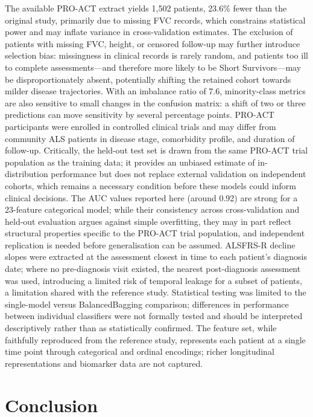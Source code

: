 \documentclass[preprint,12pt]{elsarticle}
\begin{document}
The available PRO-ACT extract yields 1,502 patients, 23.6\% fewer than the
original study, primarily due to missing FVC records, which constrains statistical
power and may inflate variance in cross-validation estimates. The exclusion of
patients with missing FVC, height, or censored follow-up may further introduce
selection bias: missingness in clinical records is rarely random, and patients
too ill to complete assessments---and therefore more likely to be Short
Survivors---may be disproportionately absent, potentially shifting the retained
cohort towards milder disease trajectories. With an imbalance ratio of 7.6,
minority-class metrics are also sensitive to small changes in the confusion
matrix: a shift of two or three predictions can move sensitivity by several
percentage points. PRO-ACT participants were enrolled in controlled clinical
trials and may differ from community ALS patients in disease stage, comorbidity
profile, and duration of follow-up. Critically, the held-out test set is drawn
from the same PRO-ACT trial population as the training data; it provides an
unbiased estimate of in-distribution performance but does not replace external
validation on independent cohorts, which remains a necessary condition before
these models could inform clinical decisions. The AUC values reported here
(around 0.92) are strong for a 23-feature categorical model; while their
consistency across cross-validation and held-out evaluation argues against simple
overfitting, they may in part reflect structural properties specific to the
PRO-ACT trial population, and independent replication is needed before
generalisation can be assumed. ALSFRS-R decline slopes were extracted at the
assessment closest in time to each patient's diagnosis date; where no
pre-diagnosis visit existed, the nearest post-diagnosis assessment was used,
introducing a limited risk of temporal leakage for a subset of patients, a
limitation shared with the reference study. Statistical testing was limited to
the single-model versus BalancedBagging comparison; differences in performance
between individual classifiers were not formally tested and should be interpreted
descriptively rather than as statistically confirmed. The feature set, while
faithfully reproduced from the reference study, represents each patient at a
single time point through categorical and ordinal encodings; richer longitudinal
representations and biomarker data are not captured.

\section{Conclusion}
\label{sec:conclusion}
\end{document}
